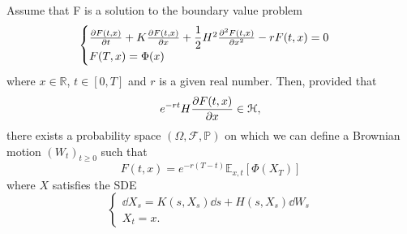 \begin{theorem}
    Assume that F is a solution to the boundary value problem
    \begin{equation}\label{bvp1}
        \begin{cases}
        \pdv{F(t,x)}{t} + K\pdv{F(t,x)}{x} + \dfrac{1}{2}H^2\pdv[2]{F(t,x)}{x}-rF(t,x)=0\\
        F(T,x) = \Phi(x)
        \end{cases}
    \end{equation}
    where $x\in\mathbb{R}$, $t\in[0,T]$ and $r$ is a given real number. Then, provided that $$e^{-rt}H\pdv{F(t,x)}{x}\in\mathcal{H},$$
    there exists a probability space $(\Omega,\mathcal{F},\mathbb{P})$ on which we can define a Brownian motion $(W_t)_{t\ge0}$ such that
    \begin{equation}
        F(t,x) = e^{-r(T-t)}\mathbb{E}_{x,t}[\Phi(X_T)]
    \end{equation}
    where $X$ satisfies the SDE
    \begin{equation}\label{fk1}
        \begin{cases}
        \dd X_s = K(s, X_s)\dd s + H(s, X_s)\dd W_s\\
        X_t = x.
        \end{cases}
    \end{equation}
\end{theorem}
